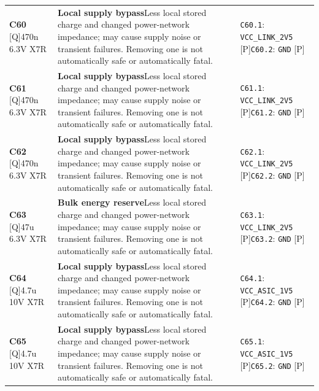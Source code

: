 \documentclass[11pt,a4paper]{article}
\begin{document}
\begin{longtable}{@{}P{27mm}P{77mm}P{62mm}@{}}
\textbf{C60} [Q]\newline 470n 6.3V X7R & \textbf{Local supply bypass}\newline Less local stored charge and changed power-network impedance; may cause supply noise or transient failures. Removing one is not automatically safe or automatically fatal. & \nolinkurl{C60.1}: \nolinkurl{VCC_LINK_2V5} [P]\newline \nolinkurl{C60.2}: \nolinkurl{GND} [P] \\
\textbf{C61} [Q]\newline 470n 6.3V X7R & \textbf{Local supply bypass}\newline Less local stored charge and changed power-network impedance; may cause supply noise or transient failures. Removing one is not automatically safe or automatically fatal. & \nolinkurl{C61.1}: \nolinkurl{VCC_LINK_2V5} [P]\newline \nolinkurl{C61.2}: \nolinkurl{GND} [P] \\
\textbf{C62} [Q]\newline 470n 6.3V X7R & \textbf{Local supply bypass}\newline Less local stored charge and changed power-network impedance; may cause supply noise or transient failures. Removing one is not automatically safe or automatically fatal. & \nolinkurl{C62.1}: \nolinkurl{VCC_LINK_2V5} [P]\newline \nolinkurl{C62.2}: \nolinkurl{GND} [P] \\
\textbf{C63} [Q]\newline 47u 6.3V X7R & \textbf{Bulk energy reserve}\newline Less local stored charge and changed power-network impedance; may cause supply noise or transient failures. Removing one is not automatically safe or automatically fatal. & \nolinkurl{C63.1}: \nolinkurl{VCC_LINK_2V5} [P]\newline \nolinkurl{C63.2}: \nolinkurl{GND} [P] \\
\textbf{C64} [Q]\newline 4.7u 10V X7R & \textbf{Local supply bypass}\newline Less local stored charge and changed power-network impedance; may cause supply noise or transient failures. Removing one is not automatically safe or automatically fatal. & \nolinkurl{C64.1}: \nolinkurl{VCC_ASIC_1V5} [P]\newline \nolinkurl{C64.2}: \nolinkurl{GND} [P] \\
\textbf{C65} [Q]\newline 4.7u 10V X7R & \textbf{Local supply bypass}\newline Less local stored charge and changed power-network impedance; may cause supply noise or transient failures. Removing one is not automatically safe or automatically fatal. & \nolinkurl{C65.1}: \nolinkurl{VCC_ASIC_1V5} [P]\newline \nolinkurl{C65.2}: \nolinkurl{GND} [P] \\

\end{longtable}
\end{document}
